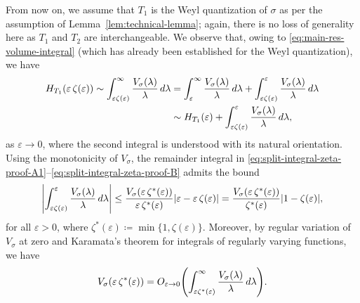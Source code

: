 \documentclass[a4paper,12pt]{article}
\let\originalleft\left
\let\originalright\right
\renewcommand{\left}{\mathopen{}\mathclose\bgroup\originalleft}
\renewcommand{\right}{\aftergroup\egroup\originalright}
\newcommand{\diff}{\mathop{}\!d}
\newcommand{\symbolnot}{\sigma}
\begin{document}
\iffalse 
From now on, we assume that $T_1$ is the Weyl quantization of $\sigma$ as per the assumption of Lemma~\ref{lem:technical-lemma}; again, there is no loss of generality here as $T_1$ and $T_2$ are interchangeable.
We observe that, owing to {\eqref{eq:main-res-volume-integral} (which has already been established for the Weyl quantization)}, 
we have 
\begin{align}
    H_{T_1}\left(\varepsilon\, \zeta(\varepsilon) \right)  
    \sim 
    \int_{\varepsilon\zeta(\varepsilon)}^\infty 
    \frac{V_{\symbolnot}(\lambda)}{\lambda} \diff \lambda
    &= \int_{\varepsilon}^\infty 
    \frac{V_{\symbolnot}(\lambda)}{\lambda} \diff \lambda
    + \int_{\varepsilon\zeta(\varepsilon)}^\varepsilon 
    \frac{V_{\symbolnot}(\lambda)}{\lambda} \diff \lambda \label{eq:split-integral-zeta-proof-A1}\\
    &\sim 
    H_{T_1}\left(\varepsilon \right) 
    + \int_{\varepsilon\zeta(\varepsilon)}^\varepsilon 
    \frac{V_{\symbolnot}(\lambda)}{\lambda} \diff \lambda,\label{eq:split-integral-zeta-proof-B}
\end{align}
as $\varepsilon\to 0$, 
where the second integral is understood with its natural orientation.
Using the monotonicity of $V_\sigma$, the remainder integral in
\eqref{eq:split-integral-zeta-proof-A1}--\eqref{eq:split-integral-zeta-proof-B} admits
the bound
\begin{equation}\label{eq:bound-remainder-volume-integral-A}
    \left\lvert\int_{\varepsilon\zeta(\varepsilon)}^\varepsilon 
    \frac{V_{\symbolnot}(\lambda)}{\lambda} \diff \lambda \right\rvert
    \leq  \frac{V_{\symbolnot}(\varepsilon \, \zeta^*(\varepsilon))}{\varepsilon \, \zeta^*(\varepsilon)}|\varepsilon - \varepsilon\, \zeta(\varepsilon)|
    = \frac{V_{\symbolnot}(\varepsilon \, \zeta^*(\varepsilon))}{\zeta^*(\varepsilon)}|1 - \zeta(\varepsilon)|,
\end{equation}
for all $ \varepsilon >0$,
where $\zeta^*(\varepsilon) \coloneqq \min \{1, \zeta(\varepsilon)\}$.
Moreover, by regular variation of $V_\sigma$ at zero and Karamata’s theorem for
integrals of regularly varying functions, we have
\begin{equation}\label{eq:volume-integral-compp-A}
    V_{\symbolnot}(\varepsilon \, \zeta^*(\varepsilon))
    = O_{\varepsilon \to 0}\left(\int_{\varepsilon\zeta^*(\varepsilon)}^\infty 
    \frac{V_{\symbolnot}(\lambda)}{\lambda} \diff \lambda\right).
\end{equation}
\end{document}
